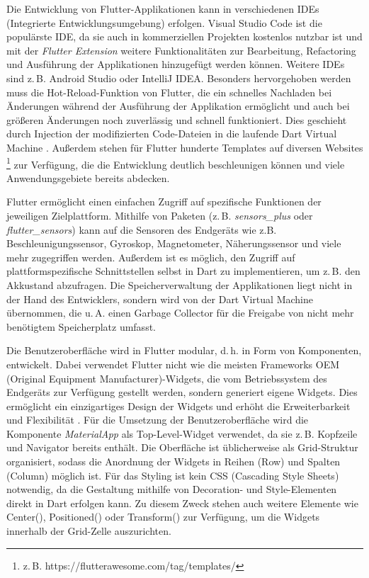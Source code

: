 \documentclass[]{lni}
\begin{document}
Die Entwicklung von Flutter-Applikationen kann in verschiedenen IDEs (Integrierte   Entwicklungsumgebung) erfolgen. Visual Studio Code ist die populärste IDE, da sie auch in kommerziellen Projekten kostenlos nutzbar ist und mit der \emph{Flutter Extension} weitere Funktionalitäten zur Bearbeitung, Refactoring und Ausführung der Applikationen hinzugefügt werden können. Weitere IDEs sind z.\,B. Android Studio oder IntelliJ IDEA. Besonders hervorgehoben werden muss die Hot-Reload-Funktion von Flutter, die ein schnelles Nachladen bei Änderungen während der Ausführung der Applikation ermöglicht und auch bei größeren Änderungen noch zuverlässig und schnell funktioniert. Dies geschieht durch Injection der modifizierten Code-Dateien in die laufende Dart Virtual Machine \cite{Zammetti.2019}. Außerdem stehen für Flutter hunderte Templates auf diversen Websites \footnote{z.\,B. https://flutterawesome.com/tag/templates/} zur Verfügung, die die Entwicklung deutlich beschleunigen können und viele Anwendungsgebiete bereits abdecken.  

Flutter ermöglicht einen einfachen Zugriff auf spezifische Funktionen der jeweiligen Zielplattform. Mithilfe von Paketen  (z.\,B. \emph{sensors\_plus} oder \emph{flutter\_sensors}) kann auf die Sensoren des Endgeräts wie z.B. Beschleunigungssensor, Gyroskop, Magnetometer, Näherungssensor und viele mehr zugegriffen werden. Außerdem ist es möglich, den Zugriff auf plattformspezifische Schnittstellen selbst in Dart zu implementieren, um z.\,B. den Akkustand abzufragen. Die Speicherverwaltung der Applikationen liegt nicht in der Hand des Entwicklers, sondern wird von der Dart Virtual Machine übernommen, die u.\,A. einen Garbage Collector für die Freigabe von nicht mehr benötigtem Speicherplatz umfasst.

Die Benutzeroberfläche wird in Flutter modular, d.\,h. in Form von Komponenten, entwickelt. Dabei verwendet Flutter nicht wie die meisten Frameworks OEM (Original Equipment Manufacturer)-Widgets, die vom Betriebssystem des Endgeräts zur Verfügung gestellt werden, sondern generiert eigene Widgets. Dies ermöglicht ein einzigartiges Design der Widgets und erhöht die Erweiterbarkeit und Flexibilität \cite{xster.16.11.2017}. Für die Umsetzung der Benutzeroberfläche wird die Komponente \emph{MaterialApp} als Top-Level-Widget verwendet, da sie z.\,B. Kopfzeile und Navigator bereits enthält. Die Oberfläche ist üblicherweise als Grid-Struktur organisiert, sodass die Anordnung der Widgets in Reihen (Row) und Spalten (Column) möglich ist. Für das Styling ist kein CSS (Cascading Style Sheets) notwendig, da die Gestaltung mithilfe von Decoration- und Style-Elementen direkt in Dart erfolgen kann. Zu diesem Zweck stehen auch weitere Elemente wie Center(), Positioned() oder Transform() zur Verfügung, um die Widgets innerhalb der Grid-Zelle auszurichten.
\end{document}
